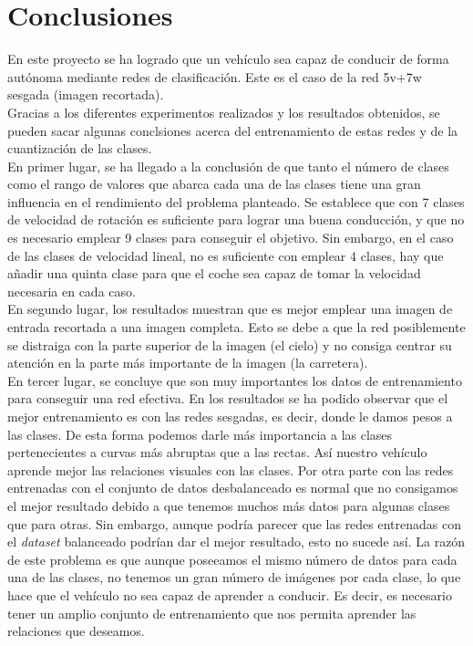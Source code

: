 \section{Conclusiones}

En este proyecto se ha logrado que un vehículo sea capaz de conducir de forma autónoma mediante redes de clasificación. Este es el caso de la red 5v+7w sesgada (imagen recortada).\\

Gracias a los diferentes experimentos realizados y los resultados obtenidos, se pueden sacar algunas conclsiones acerca del entrenamiento de estas redes y de la cuantización de las clases.\\

En primer lugar, se ha llegado a la conclusión de que tanto el número de clases como el rango de valores que abarca cada una de las clases tiene una gran influencia en el rendimiento del problema planteado. Se establece que con 7 clases de velocidad de rotación es suficiente para lograr una buena conducción, y que no es necesario emplear 9 clases para conseguir el objetivo. Sin embargo, en el caso de las clases de velocidad lineal, no es suficiente con emplear 4 clases, hay que añadir una quinta clase para que el coche sea capaz de tomar la velocidad necesaria en cada caso.\\

En segundo lugar, los resultados muestran que es mejor emplear una imagen de entrada recortada a una imagen completa. Esto se debe a que la red posiblemente se distraiga con la parte superior de la imagen (el cielo) y no consiga centrar su atención en la parte más importante de la imagen (la carretera).\\

En tercer lugar, se concluye que son muy importantes los datos de entrenamiento para conseguir una red efectiva. En los resultados se ha podido observar que el mejor entrenamiento es con las redes sesgadas, es decir, donde le damos pesos a las clases. De esta forma podemos darle más importancia a las clases pertenecientes a curvas más abruptas que a las rectas. Así nuestro vehículo aprende mejor las relaciones visuales con las clases. Por otra parte con las redes entrenadas con el conjunto de datos desbalanceado es normal que no consigamos el mejor resultado debido a que tenemos muchos más datos para algunas clases que para otras. Sin embargo, aunque podría parecer que las redes entrenadas con el \textit{dataset} balanceado podrían dar el mejor resultado, esto no sucede así. La razón de este problema es que aunque poseeamos el mismo número de datos para cada una de las clases, no tenemos un gran número de imágenes por cada clase, lo que hace que el vehículo no sea capaz de aprender a conducir. Es decir, es necesario tener un amplio conjunto de entrenamiento que nos permita aprender las relaciones que deseamos.\\

